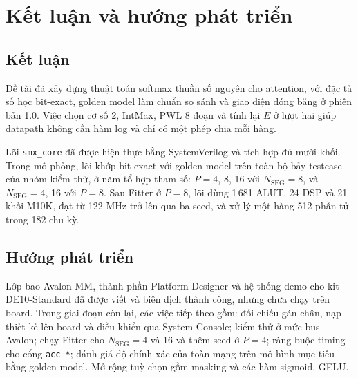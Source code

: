 \section{Kết luận và hướng phát triển}

\subsection{Kết luận}

Đề tài đã xây dựng thuật toán softmax thuần số nguyên cho attention, với đặc tả số học bit-exact, golden model làm chuẩn so sánh và giao diện đóng băng ở phiên bản 1.0. Việc chọn cơ số 2, IntMax, PWL 8 đoạn và tính lại $E$ ở lượt hai giúp datapath không cần hàm log và chỉ có một phép chia mỗi hàng.

Lõi \texttt{smx\_core} đã được hiện thực bằng SystemVerilog và tích hợp đủ mười khối. Trong mô phỏng, lõi khớp bit-exact với golden model trên toàn bộ bảy testcase của nhóm kiểm thử, ở năm tổ hợp tham số: $P = 4$, 8, 16 với $N_{\text{SEG}} = 8$, và $N_{\text{SEG}} = 4$, 16 với $P = 8$. Sau Fitter ở $P = 8$, lõi dùng 1\,681 ALUT, 24 DSP và 21 khối M10K, đạt từ 122 MHz trở lên qua ba seed, và xử lý một hàng 512 phần tử trong 182 chu kỳ.

\subsection{Hướng phát triển}

Lớp bao Avalon-MM, thành phần Platform Designer và hệ thống demo cho kit DE10-Standard đã được viết và biên dịch thành công, nhưng chưa chạy trên board. Trong giai đoạn còn lại, các việc tiếp theo gồm: đối chiếu gán chân, nạp thiết kế lên board và điều khiển qua System Console; kiểm thử ở mức bus Avalon; chạy Fitter cho $N_{\text{SEG}} = 4$ và 16 và thêm seed ở $P = 4$; ràng buộc timing cho cổng \texttt{acc\_*}; đánh giá độ chính xác của toàn mạng trên mô hình mục tiêu bằng golden model. Mở rộng tuỳ chọn gồm masking và các hàm sigmoid, GELU.
